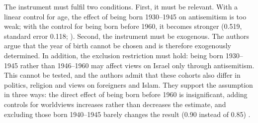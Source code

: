 The instrument must fulfil two conditions. First, it must be relevant. With a linear control for age, the effect of being born 1930--1945 on antisemitism is too weak; with the control for being born before 1960, it becomes stronger (0.519, standard error 0.118; \citealp[Table~9]{binstok2024}). Second, the instrument must be exogenous. The authors argue that the year of birth cannot be chosen and is therefore exogenously determined. In addition, the exclusion restriction must hold: being born 1930--1945 rather than 1946--1960 may affect views on Israel only through antisemitism. This cannot be tested, and the authors admit that these cohorts also differ in politics, religion and views on foreigners and Islam. They support the assumption in three ways: the direct effect of being born before 1960 is insignificant, adding controls for worldviews increases rather than decreases the estimate, and excluding those born 1940--1945 barely changes the result (0.90 instead of 0.85) \citep[pp.~2356--2360]{binstok2024}.